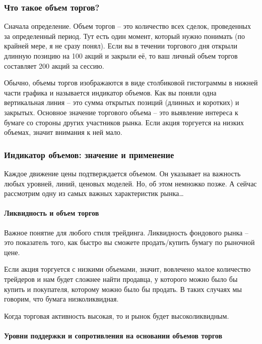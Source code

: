 \documentclass{book}
\begin{document}
\subsubsection{Что такое объем торгов?}

Сначала определение. Объем торгов – это количество всех сделок, проведенных за определенный период. Тут есть один момент, который нужно понимать (по крайней мере, я не сразу понял). Если вы в течении торгового дня открыли длинную позицию на 100 акций и закрыли её, то ваш личный объем торгов составляет 200 акций за сессию.

Обычно, объемы торгов изображаются в виде столбиковой гистограммы в
нижней части графика и называется индикатор объемов. Как вы поняли
одна вертикальная линия – это сумма открытых позиций (длинных и
коротких) и закрытых. Основное значение торгового объема – это
выявление интереса к бумаге со стороны других участников рынка. Если
акция торгуется на низких объемах, значит внимания к ней мало.

\subsubsection{Индикатор объемов: значение и применение}

Каждое движение цены подтверждается объемом. Он указывает на важность
любых уровней, линий, ценовых моделей. Но, об этом немножко позже. А
сейчас рассмотрим одну из самых важных характеристик рынка…

\paragraph{Ликвидность и объем торгов}

Важное понятие для любого стиля трейдинга. Ликвидность фондового рынка – это показатель того, как быстро вы сможете продать/купить бумагу по рыночной цене.

Если акция торгуется с низкими объемами, значит, вовлечено малое количество трейдеров и нам будет сложнее найти продавца, у которого можно было бы купить и покупателя, которому можно было бы продать. В таких случаях мы говорим, что бумага низколиквидная.

Когда торговая активность высокая, то и рынок будет высоколиквидным.

\paragraph{Уровни поддержки и сопротивления на основании объемов
  торгов}
\end{document}
